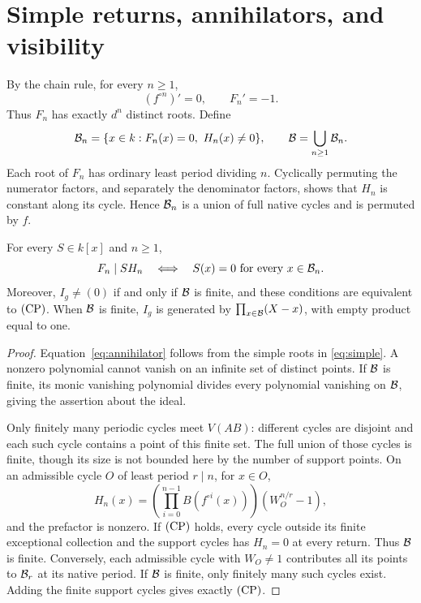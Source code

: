 \section{Simple returns, annihilators, and visibility}\label{sec:cycles}

By the chain rule, for every $n\ge1$,
\begin{equation}\label{eq:simple}
 (f^{\circ n})'=0,\qquad F_n'=-1.
\end{equation}
Thus $F_n$ has exactly $d^n$ distinct roots. Define
\begin{equation}\label{eq:badsets}
 \mathcal B_n=\{x\in k:F_n(x)=0,\ H_n(x)\ne0\},\qquad
 \mathcal B=\bigcup_{n\ge1}\mathcal B_n.
\end{equation}
Each root of $F_n$ has ordinary least period dividing $n$.
Cyclically permuting the numerator factors, and separately the
denominator factors, shows that $H_n$ is constant along its cycle.
Hence $\mathcal B_n$ is a union of full native cycles and is permuted
by $f$.

\begin{proposition}\label{prop:ideal}
For every $S\in k[x]$ and $n\ge1$,
\begin{equation}\label{eq:annihilator}
 F_n\mid SH_n\quad\Longleftrightarrow\quad
 S(x)=0\text{ for every }x\in\mathcal B_n.
\end{equation}
Moreover, $I_g\ne(0)$ if and only if $\mathcal B$ is finite, and these
conditions are equivalent to $\mathrm{(CP)}$. When $\mathcal B$ is finite,
$I_g$ is generated by $\prod_{x\in\mathcal B}(X-x)$, with empty
product equal to one.
\end{proposition}
\begin{proof}
Equation~\eqref{eq:annihilator} follows from the simple roots in
\eqref{eq:simple}. A nonzero polynomial cannot vanish on an infinite
set of distinct points. If $\mathcal B$ is finite, its monic vanishing
polynomial divides every polynomial vanishing on $\mathcal B$, giving
the assertion about the ideal.

Only finitely many periodic cycles meet $V(AB)$: different cycles
are disjoint and each such cycle contains a point of this finite
set. The full union of those cycles is finite, though its size is
not bounded here by the number of support points. On an admissible
cycle $O$ of least period $r\mid n$, for $x\in O$,
\begin{equation}\label{eq:repeatproduct}
 H_n(x)=\left(\prod_{i=0}^{n-1}B(f^{\circ i}(x))\right)
                (W_O^{n/r}-1),
\end{equation}
and the prefactor is nonzero. If $\mathrm{(CP)}$ holds, every cycle outside
its finite exceptional collection and the support cycles has
$H_n=0$ at every return. Thus $\mathcal B$ is finite. Conversely,
each admissible cycle with $W_O\ne1$ contributes all its points
to $\mathcal B_r$ at its native period. If $\mathcal B$ is finite, only
finitely many such cycles exist. Adding the finite support cycles
gives exactly $\mathrm{(CP)}$.
\end{proof}

